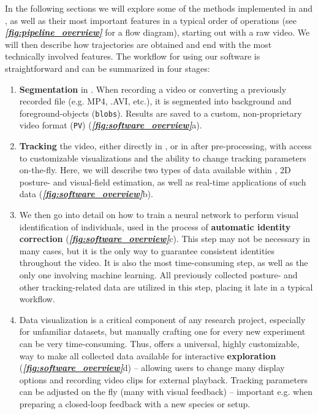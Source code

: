 \documentclass[9pt,lineno]{elife}
\newcommand{\figref}[1]{\textit{\textbf{\ref{#1}}}}
\newcommand{\TRex}{\protect\path{TRex}}
\newcommand{\TGrabs}{\protect\path{TGrabs}}
\begin{document}
In the following sections we will explore some of the methods implemented in \TRex{} and \TGrabs{}, as well as their most important features in a typical order of operations (see \figref{fig:pipeline_overview} for a flow diagram), starting out with a raw video. We will then describe how trajectories are obtained and end with the most technically involved features. The workflow for using our software is straightforward and can be summarized in four stages:

\begin{enumerate}
    \item \textbf{Segmentation} in \TGrabs{}. When recording a video or converting a previously recorded file (e.g. MP4, .AVI, etc.), it is segmented into background and foreground-objects (\verb!blobs!). Results are saved to a custom, non-proprietary video format (\verb!PV!)  (\figref{fig:software_overview}a).
    \item \textbf{Tracking} the video, either directly in \TGrabs{}, or {\color{blue} in \TRex{} after pre-processing,} with access to customizable visualizations and the ability to change tracking parameters on-the-fly. Here, we will describe two types of data available within \TRex{}, 2D posture- and visual-field estimation, as well as real-time applications of such data  (\figref{fig:software_overview}b).
    \item We then go into detail on how to train a neural network to perform visual identification of individuals, used in the process of \textbf{automatic identity correction} (\figref{fig:software_overview}c). This step may not be necessary in many cases, but it is the only way to guarantee consistent identities throughout the video. It is also the most time-consuming step, as well as the only one involving machine learning. All previously collected posture- and other tracking-related data are utilized in this step, placing it late in a typical workflow.
    \item Data visualization is a critical component of any research project, especially for unfamiliar datasets, but manually crafting one for every new experiment can be very time-consuming. Thus, \TRex{} offers a universal, highly customizable, way to make all collected data available for interactive \textbf{exploration} (\figref{fig:software_overview}d) -- allowing users to change many display options and recording video clips for external playback. Tracking parameters can be adjusted on the fly (many with visual feedback) -- important e.g. when preparing a closed-loop feedback with a new species or setup.
\end{enumerate}
\end{document}
